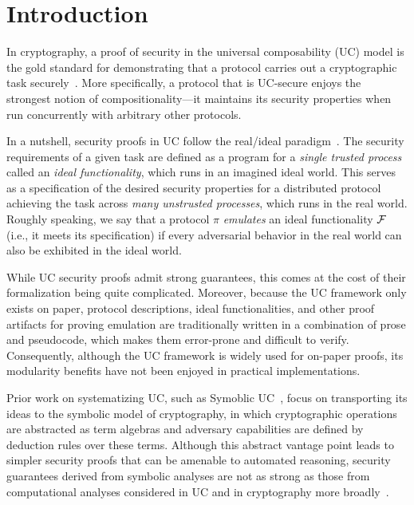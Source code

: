 \section{Introduction}
\label{sec:introduction}

In cryptography, a proof of security in the universal composability (UC) model
is the gold standard for demonstrating that a protocol carries out a
cryptographic task securely~\cite{canetti2001universally}. More specifically, a
protocol that is UC-secure enjoys the strongest notion of compositionality---it
maintains its security properties when run concurrently with arbitrary other
protocols.

In a nutshell, security proofs in UC follow the real/ideal
paradigm~\cite{goldreich1987play}. The security requirements of a given task are
defined as a program for a \emph{single trusted process} called an \emph{ideal
  functionality}, which runs in an imagined ideal world. This serves as a
specification of the desired security properties for a distributed protocol
achieving the task across \emph{many unstrusted processes}, which runs in the
real world. Roughly speaking, we say that a protocol $\pi$ \emph{emulates} an
ideal functionality $\mathcal{{F}}$ (i.e., it meets its specification) if every
adversarial behavior in the real world can also be exhibited in the ideal world.

While UC security proofs admit strong guarantees, this comes at the cost of
their formalization being quite complicated. Moreover, because the UC framework
only exists on paper, protocol descriptions, ideal functionalities, and other
proof artifacts for proving emulation are traditionally written in a combination
of prose and pseudocode, which makes them error-prone and difficult to
verify. Consequently, although the UC framework is widely used for on-paper
proofs, its modularity benefits have not been enjoyed in practical
implementations.

Prior work on systematizing UC, such as Symoblic UC~\cite{bohl2016symbolic},
focus on transporting its ideas to the symbolic model of cryptography, in which
cryptographic operations are abstracted as term algebras and adversary
capabilities are defined by deduction rules over these terms. Although this
abstract vantage point leads to simpler security proofs that can be amenable to
automated reasoning, security guarantees derived from symbolic analyses are not
as strong as those from computational analyses considered in UC and in
cryptography more broadly~\cite{cortier2011survey}. 

